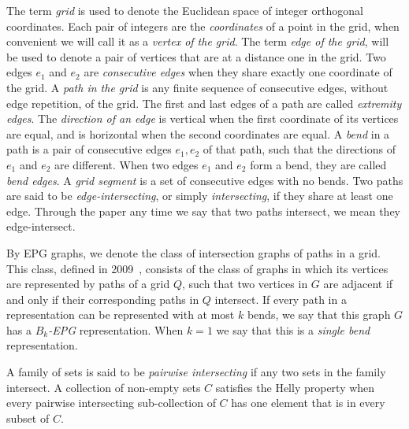 \documentclass[9pt]{entcs}
\begin{document}
The term \emph{grid} is used to denote the Euclidean space of integer orthogonal coordinates. Each pair of integers are the \emph{coordinates} of a point in the grid, when convenient we will call it as a \emph {vertex of the grid}. The term \emph{edge of the grid}, will be used to denote a pair of vertices that are at a distance one in the grid. Two edges $e_1$ and $e_2$ are \emph{consecutive edges} when they share exactly one coordinate of the grid. %
 A \emph{path in the grid} is any finite sequence of consecutive edges, without edge repetition, of the grid. The first and last edges of a path are called \emph{extremity edges}.
The \emph{direction of an edge} is vertical when the first coordinate of its vertices  are equal, and is horizontal when the second coordinates are equal. A \emph {bend} in a path is a pair of consecutive edges $ e_1, e_2 $ of that path, such that the directions of $ e_1$ and $ e_2$ are different. When two edges $ e_1$ and $e_2 $ form a bend, they are called \emph { bend edges}. A \emph {grid segment} is a set of consecutive edges with no bends. %
 Two paths are said to be \emph{edge-intersecting}, or  simply  \emph{intersecting}, if they share at least one edge. %
 Through the paper any time we say that two paths intersect, we mean they edge-intersect.  %

By EPG graphs, we denote the class of intersection graphs of paths in a grid. This class, defined in 2009~\cite{golumbic2009}, consists of the class of graphs in which its vertices are represented by paths of a grid $ Q $, such that two vertices in $ G $ are adjacent if and only if their corresponding paths in $ Q $ intersect. If every path in a representation can be represented with at most $ k $ bends, we say that this graph $ G $ has a \emph{ $ B_k$-EPG} representation.%
When $ k = 1 $ we say that this is a \emph{single bend} representation.


A family of sets is said to be \emph{pairwise intersecting} if any two sets in the family intersect. A collection of non-empty sets $C$ satisfies the Helly property when every pairwise intersecting sub-collection of $ C $ has one element that is in every subset of $C$.
\end{document}
